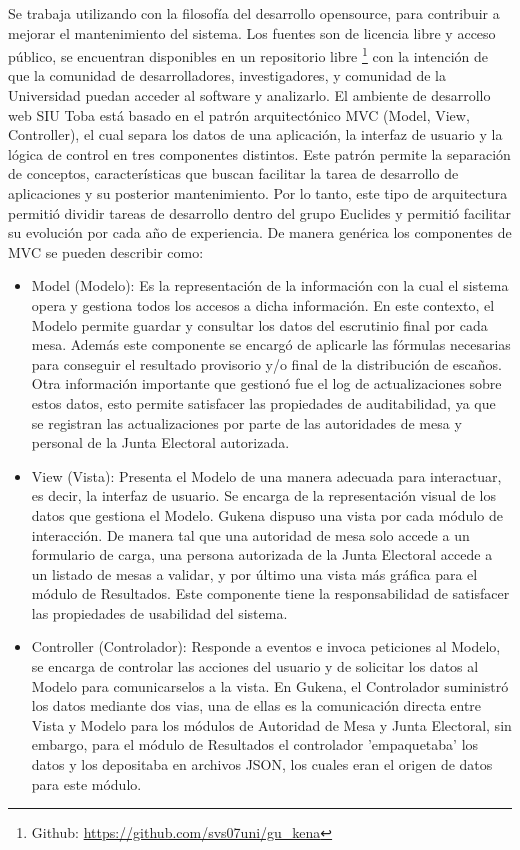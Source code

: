 Se trabaja utilizando con la filosofía del desarrollo opensource, para contribuir a mejorar el mantenimiento del sistema. Los fuentes son de licencia libre y acceso público, se encuentran disponibles en un repositorio libre
\footnote{Github: \url{https://github.com/svs07uni/gu_kena}} 
con la intención  de que la comunidad de desarrolladores, investigadores, y comunidad de la Universidad puedan acceder al software y analizarlo.
El ambiente de desarrollo web SIU Toba está basado en el patrón arquitectónico MVC (Model, View, Controller), el cual separa los datos de una aplicación, la interfaz de usuario y la lógica de control en tres componentes distintos. Este patrón permite la separación de conceptos, características que buscan facilitar la tarea de desarrollo de aplicaciones y su posterior mantenimiento. Por lo tanto, este tipo de arquitectura permitió dividir tareas de desarrollo dentro del grupo Euclides y permitió facilitar su evolución por cada año de experiencia. \newline
De manera genérica los componentes de MVC se pueden describir como:
\begin{itemize}
    \item Model (Modelo): Es la representación de la información con la cual el sistema opera y gestiona todos los accesos a dicha información. En este contexto, el Modelo permite guardar y consultar los datos del escrutinio final por cada mesa. Además este componente se encargó de aplicarle las fórmulas necesarias para conseguir el resultado provisorio y/o final de la distribución de escaños. Otra información importante que gestionó fue el log de actualizaciones sobre estos datos, esto permite satisfacer las propiedades de auditabilidad, ya que se registran las actualizaciones por parte de las autoridades de mesa y personal de la Junta Electoral autorizada.
    \item View (Vista): Presenta el Modelo de una manera adecuada para interactuar, es decir, la interfaz de usuario. Se encarga de la representación visual de los datos que gestiona el Modelo. Gukena dispuso una vista por cada módulo de interacción. De manera tal que una autoridad de mesa solo accede a un formulario de carga, una persona autorizada de la Junta Electoral accede a un listado de mesas a validar, y por último una vista más gráfica para el módulo de Resultados. Este componente tiene la responsabilidad de satisfacer las propiedades de usabilidad del sistema.
    \item Controller (Controlador): Responde a eventos e invoca peticiones al Modelo, se encarga de controlar las acciones del usuario y de solicitar los datos al Modelo para comunicarselos a la vista. En Gukena, el Controlador suministró los datos mediante dos vias, una de ellas es la comunicación directa entre Vista y Modelo para los módulos de Autoridad de Mesa y Junta Electoral, sin embargo, para el módulo de Resultados el controlador 'empaquetaba' los datos y los depositaba en archivos JSON, los cuales eran el origen de datos para este módulo.
\end{itemize}
